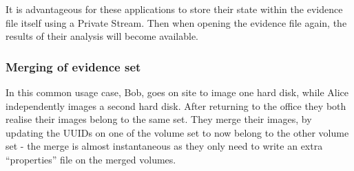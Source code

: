 \documentclass[10pt, conference]{IEEEtran}
\begin{document}
It is advantageous for these applications to store their state within
the evidence file itself using a Private Stream. Then when opening the
evidence file again, the results of their analysis will become
available.

\subsubsection{Merging of evidence set}
In this common usage case, Bob, goes on site to image one hard disk,
while Alice independently images a second hard disk. After returning
to the office they both realise their images belong to the same
set. They merge their images, by updating the UUIDs on one of the
volume set to now belong to the other volume set - the merge is almost
instantaneous as they only need to write an extra ``properties'' file
on the merged volumes.



\end{document}
